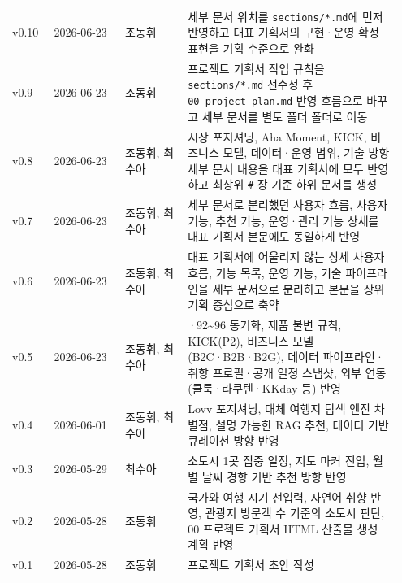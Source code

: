 \documentclass[12pt,a4paper]{article}
\begin{document}
\begin{footnotesize}
\begin{longtable}{@{}>{\centering\arraybackslash}m{0.106\linewidth}>{\centering\arraybackslash}m{0.174\linewidth}>{\centering\arraybackslash}m{0.155\linewidth}>{\RaggedRight\arraybackslash}m{0.512\linewidth}@{}}
v0.10 & {\footnotesize 2026-\allowbreak{}06-\allowbreak{}23} & 조동휘 & 세부 문서 위치를 \texttt{sections/\allowbreak{}*.\allowbreak{}md}에 먼저 반영하고 대표 기획서의 구현·운영 확정 표현을 기획 수준으로 완화 \\
v0.9 & {\footnotesize 2026-\allowbreak{}06-\allowbreak{}23} & 조동휘 & 프로젝트 기획서 작업 규칙을 \texttt{sections/\allowbreak{}*.\allowbreak{}md} 선수정 후 \texttt{00\_\allowbreak{}project\_\allowbreak{}plan.\allowbreak{}md} 반영 흐름으로 바꾸고 세부 문서를 별도 폴더 폴더로 이동 \\
v0.8 & {\footnotesize 2026-\allowbreak{}06-\allowbreak{}23} & 조동휘, 최수아 & 시장 포지셔닝, Aha Moment, KICK, 비즈니스 모델, 데이터·운영 범위, 기술 방향 세부 문서 내용을 대표 기획서에 모두 반영하고 최상위 \texttt{\#\allowbreak{}} 장 기준 하위 문서를 생성 \\
v0.7 & {\footnotesize 2026-\allowbreak{}06-\allowbreak{}23} & 조동휘, 최수아 & 세부 문서로 분리했던 사용자 흐름, 사용자 기능, 추천 기능, 운영·관리 기능 상세를 대표 기획서 본문에도 동일하게 반영 \\
v0.6 & {\footnotesize 2026-\allowbreak{}06-\allowbreak{}23} & 조동휘, 최수아 & 대표 기획서에 어울리지 않는 상세 사용자 흐름, 기능 목록, 운영 기능, 기술 파이프라인을 세부 문서으로 분리하고 본문을 상위 기획 중심으로 축약 \\
v0.5 & {\footnotesize 2026-\allowbreak{}06-\allowbreak{}23} & 조동휘, 최수아 & 03·92\textasciitilde{}96 동기화, 제품 불변 규칙, KICK(P2), 비즈니스 모델(B2C·B2B·B2G), 데이터 파이프라인·취향 프로필·공개 일정 스냅샷, 외부 연동(클룩·라쿠텐·KKday 등) 반영 \\
v0.4 & {\footnotesize 2026-\allowbreak{}06-\allowbreak{}01} & 조동휘, 최수아 & Lovv 포지셔닝, 대체 여행지 탐색 엔진 차별점, 설명 가능한 RAG 추천, 데이터 기반 큐레이션 방향 반영 \\
v0.3 & {\footnotesize 2026-\allowbreak{}05-\allowbreak{}29} & 최수아 & 소도시 1곳 집중 일정, 지도 마커 진입, 월별 날씨 경향 기반 추천 방향 반영 \\
v0.2 & {\footnotesize 2026-\allowbreak{}05-\allowbreak{}28} & 조동휘 & 국가와 여행 시기 선입력, 자연어 취향 반영, 관광지 방문객 수 기준의 소도시 판단, 00 프로젝트 기획서 HTML 산출물 생성 계획 반영 \\
v0.1 & {\footnotesize 2026-\allowbreak{}05-\allowbreak{}28} & 조동휘 & 프로젝트 기획서 초안 작성 \\
\bottomrule
\end{longtable}
\end{footnotesize}
\end{document}
